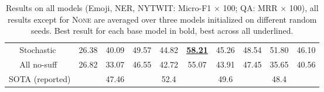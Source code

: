 \begin{table*}
\begin{tabular}{llccccccccc}
        & Stochastic & 26.38 & 40.09 & 49.57 & 44.82 & \underline{\textbf{58.21}} & 45.26 & 48.54 & 51.80 & 46.10 \\
        & All no-suff & 26.82 & 33.07 & 46.55 & 42.72 & 55.07 & 43.91 & 47.45 & 35.65 & 40.56 \\
        \midrule
        \multicolumn{2}{l}{SOTA (reported)} & & 47.46 & & 52.4\phantom{0} & & 49.6\phantom{0} & & 48.4\phantom{0} & \\
        \bottomrule
    \end{tabular}
    \caption{Results on all models (Emoji, NER, NYTWIT: Micro-F1 $\times$ 100; QA: MRR $\times$ 100), all results except for \textsc{None} are averaged over three models initialized on different random seeds.
    Best result for each base model in bold, best across all underlined.
    }
    \label{tab:main_results}
\end{table*}



